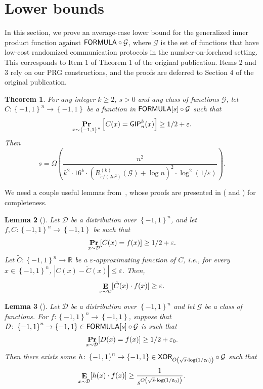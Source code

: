 \documentclass[10pt,a4paper]{article}
\newtheorem{theorem}{Theorem}
\newtheorem{lemma}[theorem]{Lemma}
\DeclareMathOperator*\Exp{{\bf E}}
\DeclareMathOperator*\Prob{{\bf Pr}}
\newcommand{\boolpm}{\left\{-1,1\right\}}
\newcommand{\FORMULA}{{\sf FORMULA}}
\newcommand{\XOR}{{\sf XOR}}
\newcommand{\GIP}{{\sf GIP}}
\newcommand{\real}{\mathbb{R}}
\begin{document}
\setcounter{theorem}{18}
	\section{Lower bounds}\label{sec:lower-bounds}
	
	In this section, we prove an average-case lower bound for the generalized inner product function against $\FORMULA\circ\mathcal{G}$, where $\mathcal{G}$ is the set of functions that have low-cost randomized communication protocols in the number-on-forehead setting. This corresponds to Item 1 of Theorem 1 of the original publication. Items 2 and 3 rely on our PRG constructions, and the proofs are deferred to Section 4 of the original publication.
	
	\begin{theorem}\label{thm:lb-main}
		For any integer $k\geq 2$, $s>0$ and any class of functions $\mathcal{G}$, let $C\colon\boolpm^{n}\to\boolpm$ be a function in $\FORMULA[s]\circ\mathcal{G}$ such that
		\[
		    \Prob_{x\sim\boolpm^{n}}\left[C(x)=\GIP_{n}^{k}(x)\right]\geq 1/2+\varepsilon.
		\]
		Then
		\[
	  		s = \Omega\left( \frac{n^2}{k^2\cdot16^{k}\cdot\left(R^{(k)}_{\varepsilon/(2n^2)}(\mathcal{G})+\log n\right)^2\cdot\log^2(1/\varepsilon)}\right).
		\]
	\end{theorem}
	
	We need a couple useful lemmas from~\cite{Tal16}, whose proofs are presented in  ( and ) for completeness.
	
	\begin{lemma}[\cite{Tal16}]\label{lem:lb-Tal-1}
	    Let $\mathcal{D}$ be a distribution over $\boolpm^n$, and let $f,C\colon\boolpm^n\to\boolpm$ be such that
	    \[
	        \Prob_{x\sim\mathcal{D}}[C(x)=f(x)]\geq 1/2+\varepsilon.
	    \] 
	    Let $\tilde{C}\colon\boolpm^n\to\real$ be a $\varepsilon$-approximating function of $C$, i.e., for every $x\in\boolpm^n$, $|C(x)-\tilde{C}(x)|\leq \varepsilon$. Then,
	    \[
	        \Exp_{x\sim\mathcal{D}}[\tilde{C}(x)\cdot f(x)]\geq \varepsilon.
	    \]
	\end{lemma}
	
	\begin{lemma}[\cite{Tal16}]\label{lem:lb-Tal-2}
	    Let $\mathcal{D}$ be a distribution over $\boolpm^n$ and let $\mathcal{G}$ be a class of functions. For $f\colon\boolpm^n\to\boolpm$, suppose that $D\colon\boolpm^n\to\boolpm\in \FORMULA[s]\circ\mathcal{G}$ is such that 
	    \[
	        \Prob_{x\sim\mathcal{D}}[D(x)=f(x)]\geq 1/2+\varepsilon_0.
	    \]
	    Then there exists some $h\colon\boolpm^n\to\boolpm\in \XOR_{O\left(\sqrt{s}\cdot\log(1/\varepsilon_0)\right)}\circ \mathcal{G}$ such that
	    \[
	        \Exp_{x\sim\mathcal{D}}[h(x)\cdot f(x)]\geq \frac{1}{s^{O\left(\sqrt{s}\cdot\log(1/\varepsilon_0)\right)}}.
	    \]
	\end{lemma}
    
\end{document}
